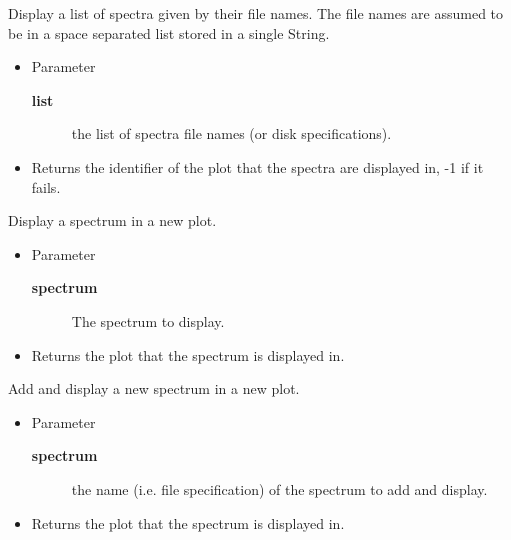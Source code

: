 \begin{desc}Display a list of spectra given by their file names. The file
 names are assumed to be in a space separated list stored in a
 single String.
\begin{itemize}
\item{Parameter
  \begin{description}
   \item[\textbf{list}]{the list of spectra file names (or disk
             specifications).}
  \end{description}}
\end{itemize}
\begin{itemize}
\item{Returns the identifier of the plot that the spectra are
         displayed in, -1 if it fails. }
\end{itemize}
\end{desc}

\begin{desc}Display a spectrum in a new plot.
\begin{itemize}
\item{Parameter
  \begin{description}
   \item[\textbf{spectrum}]{The spectrum to display.}
  \end{description}}
\end{itemize}
\begin{itemize}
\item{Returns the plot that the spectrum is displayed in. }
\end{itemize}
\end{desc}

\begin{desc}Add and display a new spectrum in a new plot.
\begin{itemize}
\item{Parameter
  \begin{description}
   \item[\textbf{spectrum}]{the name (i.e. file specification) of the spectrum
                 to add and display.}
  \end{description}}
\end{itemize}
\begin{itemize}
\item{Returns the plot that the spectrum is displayed in. }
\end{itemize}
\end{desc}

